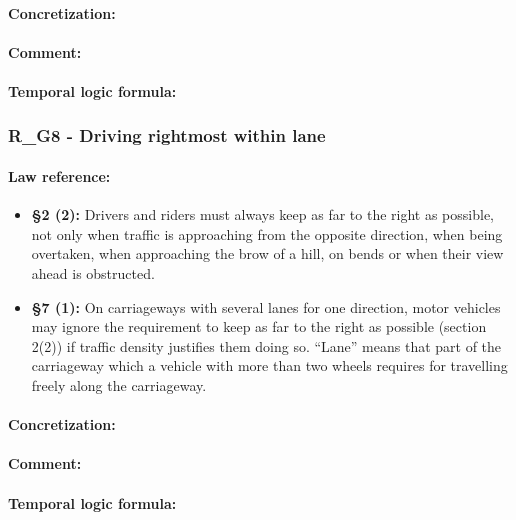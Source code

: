\paragraph{Concretization:}

\paragraph{Comment:}

\paragraph{Temporal logic formula:}

\subsubsection{R\_G8 - Driving rightmost within lane}
\paragraph{Law reference:}

\begin{itemize}
	\item \textbf{\stvo \S 2 (2):} Drivers and riders must always keep as far to the right as possible, not only when traffic is approaching from the opposite direction, when being overtaken, when approaching the brow of a hill, on bends or when their view ahead is obstructed.
	
	\item \textbf{\stvo \S 7 (1):} On carriageways with several lanes for one direction, motor vehicles may ignore the requirement to keep as far to the right as possible (section 2(2)) if traffic density justifies them doing so. “Lane” means that part of the carriageway which a vehicle with more than two wheels requires for travelling freely along the carriageway.
	
\end{itemize}

\paragraph{Concretization:}

\paragraph{Comment:}

\paragraph{Temporal logic formula:}

